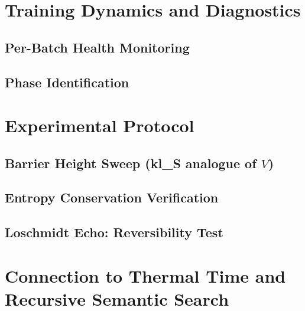 \documentclass[11pt]{article}
\begin{document}
\section{Training Dynamics and Diagnostics}
\label{sec:training}

  \subsection{Per-Batch Health Monitoring}
  \label{sec:monitoring}

  \subsection{Phase Identification}
  \label{sec:phases}

\section{Experimental Protocol}
\label{sec:experiments}

  \subsection{Barrier Height Sweep (kl\_S analogue of $V$)}
  \label{sec:barrier_sweep}

  \subsection{Entropy Conservation Verification}
  \label{sec:conservation_exp}

  \subsection{Loschmidt Echo: Reversibility Test}
  \label{sec:loschmidt}

\section{Connection to Thermal Time and Recursive Semantic Search}
\label{sec:thermal_time}
\end{document}
